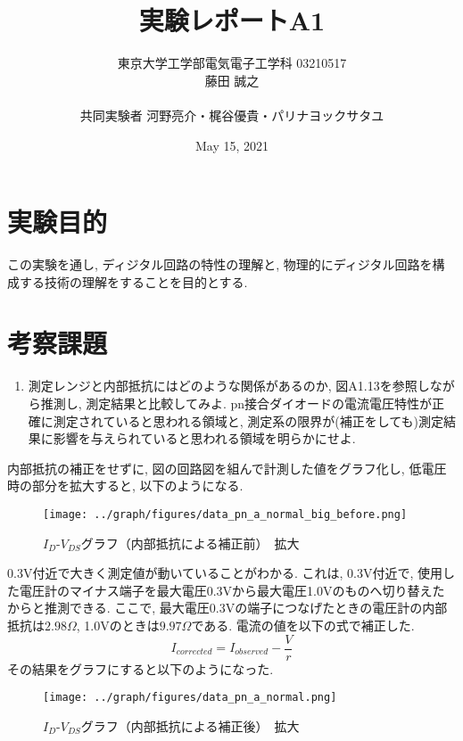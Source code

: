 \documentclass[a4j,dvipdfmx,titlepage]{article}
\title{実験レポートA1}
\author{東京大学工学部電気電子工学科 03210517\\藤田 誠之\\~\\ 共同実験者  河野亮介・梶谷優貴・パリナヨックサタユ}
\date{May 15, 2021}
\begin{document}

\maketitle
\newpage

\section{実験目的}
この実験を通し, ディジタル回路の特性の理解と, 物理的にディジタル回路を構成する技術の理解をすることを目的とする. 

\section{考察課題}

\begin{enumerate}[label={(\arabic*)}]
  \item 測定レンジと内部抵抗にはどのような関係があるのか, 図A1.13を参照しながら推測し, 測定結果と比較してみよ. pn接合ダイオードの電流電圧特性が正確に測定されていると思われる領域と, 測定系の限界が(補正をしても)測定結果に影響を与えられていると思われる領域を明らかにせよ. 
\end{enumerate}
内部抵抗の補正をせずに, 図の回路図を組んで計測した値をグラフ化し, 低電圧時の部分を拡大すると, 以下のようになる. 
\begin{figure}[H]
  \begin{center}
  \texttt{[image: ../graph/figures/data\_pn\_a\_normal\_big\_before.png]}
  \caption{$I_D$-$V_{DS}$グラフ（内部抵抗による補正前）　拡大}
  \end{center}
\end{figure}

0.3V付近で大きく測定値が動いていることがわかる. これは, 0.3V付近で, 使用した電圧計のマイナス端子を最大電圧0.3Vから最大電圧1.0Vのものへ切り替えたからと推測できる. ここで, 最大電圧0.3Vの端子につなげたときの電圧計の内部抵抗は$2.98\Omega$, 1.0Vのときは$9.97\Omega$である. 電流の値を以下の式で補正した. 
$$
I_{corrected} = I_{observed} - \frac{V}{r}
$$
その結果をグラフにすると以下のようになった. 

\begin{figure}[H]
  \begin{center}
  \texttt{[image: ../graph/figures/data\_pn\_a\_normal.png]}
  \caption{$I_D$-$V_{DS}$グラフ（内部抵抗による補正後）　拡大}
  \end{center}
\end{figure}
\end{document}

